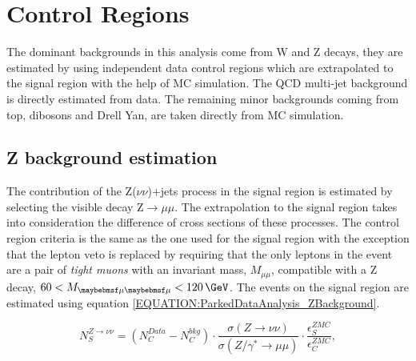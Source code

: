 \section{Control Regions}
\label{SECTION:ParkedDataAnalysis_ControlRegions}

The dominant backgrounds in this analysis come from W and Z decays, they are estimated by using independent data control regions which are extrapolated to the signal region with the help of \gls{MC} simulation. The \gls{QCD} multi-jet background is directly estimated from data. The remaining minor backgrounds coming from top, dibosons and Drell Yan, are taken directly from \gls{MC} simulation.

\subsection{Z background estimation}
\label{SECTION:ParkedDataAnalysis_ControlRegions_ZBackground}


The contribution of the Z($\nu\nu$)+jets process in the signal region is estimated by selecting the visible decay Z$\rightarrow\mu\mu$. The extrapolation to the signal region takes into consideration the difference of cross sections of these processes. The control region criteria is the same as the one used for the signal region with the exception that the lepton veto is replaced by requiring that the only leptons in the event are a pair of \textit{tight muons} with an invariant mass, $M_{\mu\mu}$, compatible with a Z decay, $60<M_{\mu\mu}<120\,\GeV$. The events on the signal region are estimated using equation \ref{EQUATION:ParkedDataAnalysis_ZBackground}.

\begin{equation}
N_{S}^{Z\rightarrow\nu\nu}=\left(N_{C}^{Data}-N_{C}^{bkg}\right) \cdot\frac{\sigma\left(Z\rightarrow\nu\nu\right)}{\sigma\left(Z/\gamma^{*}\rightarrow\mu\mu\right)}\cdot \frac{\epsilon_{S}^{ZMC}}{\epsilon_{C}^{ZMC}},
\label{EQUATION:ParkedDataAnalysis_ZBackground}
\end{equation}

